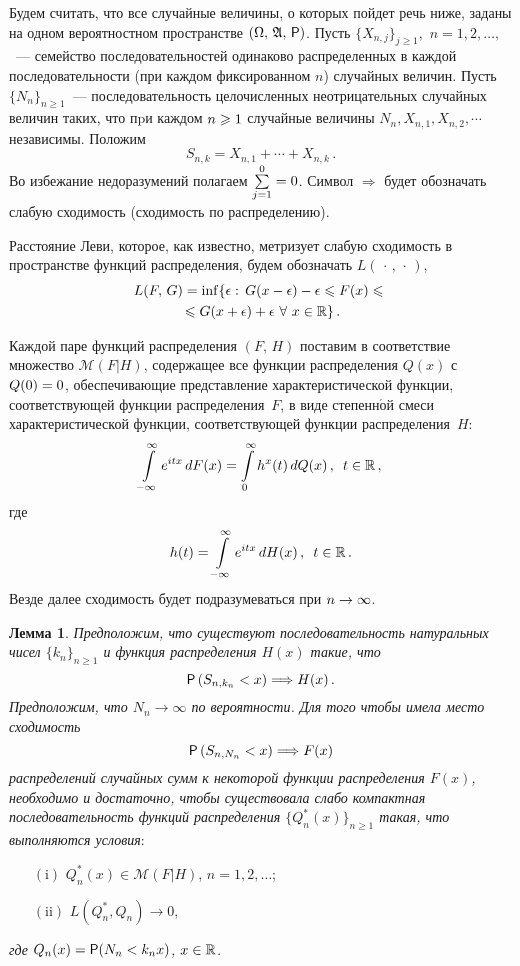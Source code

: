 \begin{multicols}{2}
Будем считать, что все случайные величины, о которых пойдет речь
ниже, заданы на одном вероятностном пространстве $(\Omega,\,
\mathfrak{A},\,{\sf P})$. Пусть $\{X_{n,j}\}_{j\geqslant1},$
$n=1,2,\ldots,$~--- семейство последовательностей одинаково
распределенных в каждой последовательности (при каждом фиксированном
$n$) случайных величин. Пусть $\{N_n\}_{n\geqslant1}$~---
последовательность целочисленных неотрицательных случайных величин
таких, что пpи каждом $n\hm\geqslant1$ случайные величины
$N_n,X_{n,1},X_{n,2},\cdots$ независимы. Положим
$$
S_{n,k}=X_{n,1}+\cdots +X_{n,k}\,.
$$
Во избежание недоразумений полагаем $\sum\limits_{j=1}^0\hm=0$. Символ
$\Longrightarrow$ будет обозначать слабую сходимость (сходимость по
распределению).

Расстояние Леви, которое, как известно, метризует слабую сходимость
в пространстве функций распределения, будем обозначать
$L(\,\cdot\,,\,\cdot\,)$,
\begin{multline*}
L(F,\,G)=\inf\{\epsilon:\,G(x-\epsilon)-\epsilon\leqslant F(x)\leqslant{}\\
{}\leqslant
G(x+\epsilon)+\epsilon\ \forall\ x\in\mathbb{R}\}\,.
\end{multline*}

Каждой паре функций распределения $(F,\,H)$ поста\-вим в соответствие
множество $\mathcal{M}(F|H)$, содержащее все функции распределения
$Q(x)$ с $Q(0)\hm=0$, обеспечивающие представление характеристической
функции, соответствующей функции распределения~$F$, в виде
степенн$\acute{\mbox{о}}$й смеси характеристической функции, соответствующей
функции распределения~$H$:
$$
\int\limits_{-\infty}^{\infty}e^{itx}\,dF(x)=\int\limits_{0}^{\infty}h^x(t)\,dQ(x)\,,\enskip
 t\in\mathbb{R}\,,
$$
где
$$
h(t)=\int\limits_{-\infty}^{\infty}e^{itx}\,dH(x)\,,\enskip t\in\mathbb{R}\,.
$$
Везде далее сходимость будет подразумеваться при $n\hm\to\infty$.

\smallskip

\noindent
\textbf{Лемма 1}. \textit{Предположим, что существуют последовательность
натуральных чисел $\{k_n\}_{n\geqslant1}$ и функция распределения $H(x)$
такие, что}
$$
{\sf P}\left(S_{n,k_n}<x\right)\Longrightarrow H(x)\,.
$$
\textit{Предположим, что $N_n\to\infty$ по вероятности. Для того чтобы имела
место сходимость}
$$
{\sf P}\left(S_{n,N_n}<x\right)\Longrightarrow F(x)
$$
\textit{распределений случайных сумм к некоторой функции распределения
$F(x)$, необходимо и достаточно, чтобы существовала слабо компактная
последовательность функций распределения $\{Q_n^*(x)\}_{n\geqslant1}$
такая, что выполняются условия}:
\begin{enumerate}
\item[$\mathrm{(i)}$] $Q_n^*(x)\in\mathcal{M}(F|H)$, $n=1,2,\ldots$;
\item[$\mathrm{(ii)}$] $L(Q_n^*,Q_n)\longrightarrow 0$,
\end{enumerate}
{\it где $Q_n(x)={\sf P}(N_n<k_nx)$, $x\in\mathbb{R}$.}


\end{multicols}
